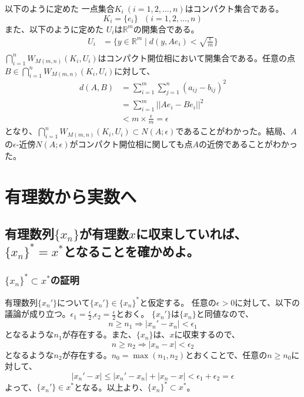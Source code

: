\documentclass{jsarticle}
\begin{document}
以下のように定めた 一点集合$K_i\ (i=1,2,...,n)$はコンパクト集合である。
\[K_i=\{e_i\}\ \ \ (i=1,2,...,n)\]
また、以下のように定めた $U_i$は$\mathbb{R}^m$の開集合である。
\begin{align*}
U_i&=\{y\in\mathbb{R}^m\mid d(y,Ae_i)<\sqrt{\frac{\epsilon}{m}}\}\\
\end{align*}
$\bigcap_{i=1}^{n}W_{M(m,n)}(K_i,U_i)$はコンパクト開位相において開集合である。任意の点$B\in\bigcap_{i=1}^{n}W_{M(m,n)}(K_i,U_i)$に対して、
\begin{align*}
d(A,B)&=\sum_{i=1}^{m}\sum_{j=1}^{n}(a_{ij}-b_{ij})^2\\
&=\sum_{i=1}^{m}||Ae_i-Be_i||^2\\
&< m\times\frac{\epsilon}{m}=\epsilon
\end{align*}
となり、$\bigcap_{i=1}^{n}W_{M(m,n)}(K_i,U_i)\subset N(A;\epsilon)$であることがわかった。結局、$A$の$\epsilon$-近傍$N(A;\epsilon)$がコンパクト開位相に関しても点$A$の近傍であることがわかった。

























\newpage
\appendix
\section{有理数から実数へ}
\subsection{有理数列$\{x_n\}$が有理数$x$に収束していれば、$\{x_n\}^*=x^*$となることを確かめよ。}
\subsubsection{$\{x_n\}^*\subset x^*$の証明}
有理数列$\{x_n'\}$について$\{x_n'\}\in\{x_n\}^*$と仮定する。
任意の$\epsilon>0$に対して、以下の議論が成り立つ。$\epsilon_1=\frac{\epsilon}{2}$,$\epsilon_2=\frac{\epsilon}{2}$とおく。
$\{x_n'\}$は$\{x_n\}$と同値なので、
\[n\geq n_1 \Longrightarrow|x_n'-x_n|<\epsilon_1\]
となるような$n_1$が存在する。また、$\{x_n\}$は、$x$に収束するので、
\[n\geq n_2 \Longrightarrow|x_n-x|<\epsilon_2\]
となるような$n_2$が存在する。$n_0=\max(n_1,n_2)$とおくことで、任意の$n\geq n_0$に対して、
\[|x_n'-x|\leq |x_n'-x_n|+|x_n-x| < \epsilon_1+\epsilon_2 =\epsilon\]
よって、$\{x_n'\}\in x^*$となる。以上より、$\{x_n\}^*\subset x^*$。
\end{document}
